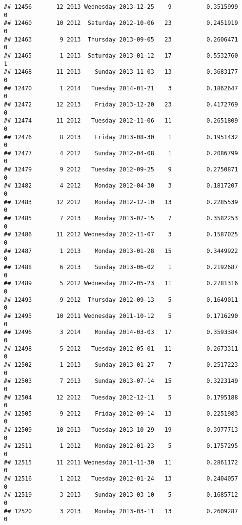 \documentclass[
]{article}
\begin{document}
\begin{verbatim}
## 12456       12 2013 Wednesday 2013-12-25    9          0.3515999             0
## 12460       10 2012  Saturday 2012-10-06   23          0.2451919             0
## 12463        9 2013  Thursday 2013-09-05   23          0.2606471             0
## 12465        1 2013  Saturday 2013-01-12   17          0.5532760             1
## 12468       11 2013    Sunday 2013-11-03   13          0.3683177             0
## 12470        1 2014   Tuesday 2014-01-21    3          0.1862647             0
## 12472       12 2013    Friday 2013-12-20   23          0.4172769             0
## 12474       11 2012   Tuesday 2012-11-06   11          0.2651809             0
## 12476        8 2013    Friday 2013-08-30    1          0.1951432             0
## 12477        4 2012    Sunday 2012-04-08    1          0.2086799             0
## 12479        9 2012   Tuesday 2012-09-25    9          0.2750871             0
## 12482        4 2012    Monday 2012-04-30    3          0.1817207             0
## 12483       12 2012    Monday 2012-12-10   13          0.2285539             0
## 12485        7 2013    Monday 2013-07-15    7          0.3582253             0
## 12486       11 2012 Wednesday 2012-11-07    3          0.1587025             0
## 12487        1 2013    Monday 2013-01-28   15          0.3449922             0
## 12488        6 2013    Sunday 2013-06-02    1          0.2192687             0
## 12489        5 2012 Wednesday 2012-05-23   11          0.2781316             0
## 12493        9 2012  Thursday 2012-09-13    5          0.1649011             0
## 12495       10 2011 Wednesday 2011-10-12    5          0.1716290             0
## 12496        3 2014    Monday 2014-03-03   17          0.3593384             0
## 12498        5 2012   Tuesday 2012-05-01   11          0.2673311             0
## 12502        1 2013    Sunday 2013-01-27    7          0.2517223             0
## 12503        7 2013    Sunday 2013-07-14   15          0.3223149             0
## 12504       12 2012   Tuesday 2012-12-11    5          0.1795188             0
## 12505        9 2012    Friday 2012-09-14   13          0.2251983             0
## 12509       10 2013   Tuesday 2013-10-29   19          0.3977713             0
## 12511        1 2012    Monday 2012-01-23    5          0.1757295             0
## 12515       11 2011 Wednesday 2011-11-30   11          0.2861172             0
## 12516        1 2012   Tuesday 2012-01-24   13          0.2404057             0
## 12519        3 2013    Sunday 2013-03-10    5          0.1685712             0
## 12520        3 2013    Monday 2013-03-11   13          0.2609287             0

\end{verbatim}
\end{document}
